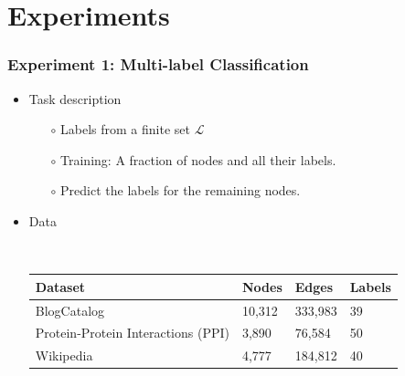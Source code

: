 \documentclass[10pt, aspectratio=169]{beamer}
\begin{document}
\section{Experiments}
\begin{frame}
    \frametitle{Experiment 1: Multi-label Classification}
    \begin{itemize}
        \item Task description
            \begin{itemize}
                \item[$\circ$] Labels from a finite set $\mathcal{L}$
                \item[$\circ$] Training: A fraction of nodes and all their labels.
                \item[$\circ$] Predict the labels for the remaining nodes.
            \end{itemize}
        \item Data\par
            ~\\
            \begin{tabular}{llll}
                \toprule
                \textbf{Dataset} & \textbf{Nodes} & \textbf{Edges} & \textbf{Labels}\\
                \midrule
                BlogCatalog & 10,312 & 333,983 & 39\\
                Protein-Protein Interactions (PPI) & 3,890 & 76,584 & 50\\
                Wikipedia & 4,777 & 184,812 & 40\\
                \bottomrule
            \end{tabular}
    \end{itemize}
\end{frame}
\end{document}

